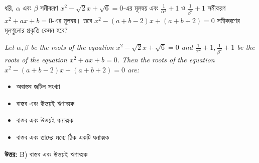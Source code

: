 \documentclass[12pt, a4paper]{article}
\begin{document}
\vspace{1em}

\begin{tcolorbox}[questionbox={প্রশ্ন (Question) 36}]
    \noindent
    ধরি, $\alpha$ এবং $\beta$ সমীকরণ $x^2 - \sqrt{2}x + \sqrt{6} = 0$-এর মূলদ্বয় এবং $\frac{1}{\alpha^2}+1$ ও $\frac{1}{\beta^2}+1$ সমীকরণ $x^2 + ax + b = 0$-এর মূলদ্বয়। তবে $x^2 - (a+b-2)x + (a+b+2) = 0$ সমীকরণের মূলগুলোর প্রকৃতি কেমন হবে?
    
    \vspace{0.8em}
    \begin{english}
    \noindent\textit{\color{darkgray}
    Let $\alpha, \beta$ be the roots of the equation $x^2 - \sqrt{2}x + \sqrt{6} = 0$ and $\frac{1}{\alpha^2}+1, \frac{1}{\beta^2}+1$ be the roots of the equation $x^2 + ax + b = 0$. Then the roots of the equation $x^2 - (a+b-2)x + (a+b+2) = 0$ are:
    }
    \end{english}
\end{tcolorbox}

\begin{itemize}[label={}, leftmargin=1cm, itemsep=0.5em]
    \item[\textbf{A)}] অবাস্তব জটিল সংখ্যা
    \item[\textbf{B)}] বাস্তব এবং উভয়ই ঋণাত্মক
    \item[\textbf{C)}] বাস্তব এবং উভয়ই ধনাত্মক
    \item[\textbf{D)}] বাস্তব এবং তাদের মধ্যে ঠিক একটি ধনাত্মক
\end{itemize}

\vspace{0.5em}
\begin{tcolorbox}[answerbox]
    \textbf{\color{success} উত্তর:} B) বাস্তব এবং উভয়ই ঋণাত্মক
\end{tcolorbox}
\vspace{1em}
\end{document}
